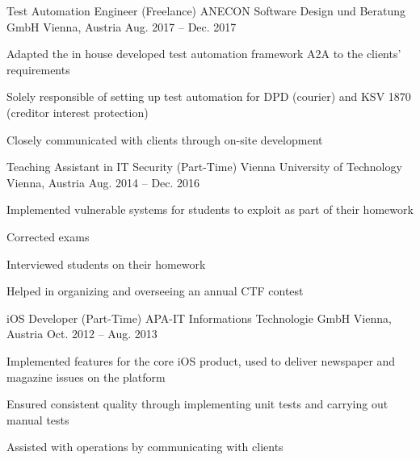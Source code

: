 \begin{cventries}

\cventry
{Test Automation Engineer (Freelance)} %
{ANECON Software Design und Beratung GmbH} %
{Vienna, Austria} %
{Aug. 2017 -- Dec. 2017} %
{ %
\begin{cvitems}
\item {Adapted the in house developed test automation framework A2A to the clients' requirements}
\item {Solely responsible of setting up test automation for DPD (courier) and KSV 1870 (creditor interest protection)}
\item {Closely communicated with clients through on-site development}
\end{cvitems}
}


\cventry
{Teaching Assistant in IT Security (Part-Time)} %
{Vienna University of Technology} %
{Vienna, Austria} %
{Aug. 2014 -- Dec. 2016} %
{ %
\begin{cvitems}
\item {Implemented vulnerable systems for students to exploit as part of their homework}
\item {Corrected exams}
\item {Interviewed students on their homework}
\item {Helped in organizing and overseeing an annual CTF contest}
\end{cvitems}
}


\cventry
{iOS Developer (Part-Time)} %
{APA-IT Informations Technologie GmbH} %
{Vienna, Austria} %
{Oct. 2012 -- Aug. 2013} %
{ %
\begin{cvitems}
\item {Implemented features for the core iOS product, used to deliver newspaper and magazine issues on the platform}
\item {Ensured consistent quality through implementing unit tests and carrying out manual tests}
\item {Assisted with operations by communicating with clients}
\end{cvitems}
}


\end{cventries}